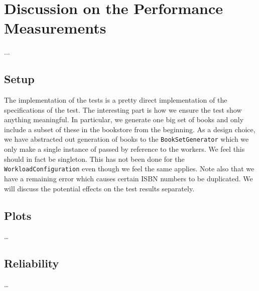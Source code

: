 
\section{Discussion on the Performance Measurements}
...

\subsection{Setup}
The implementation of the tests is a pretty direct implementation of the
specifications of the test. The interesting part is how we ensure the test
show anything meaningful. In particular, we generate one big set of books and
only include a subset of these in the bookstore from the beginning. As a
design choice, we have abstracted out generation of books to the
{\tt BookSetGenerator} which we only make a single instance of passed by
reference to the workers. We feel this should in fact be singleton. This has
not been done for the {\tt WorkloadConfiguration} even though we feel the same
applies. Note also that we have a remaining error which causes certain ISBN
numbers to be duplicated. We will discuss the potential effects on the test
results separately.

\subsection{Plots}
\dots

\subsection{Reliability}
\dots
